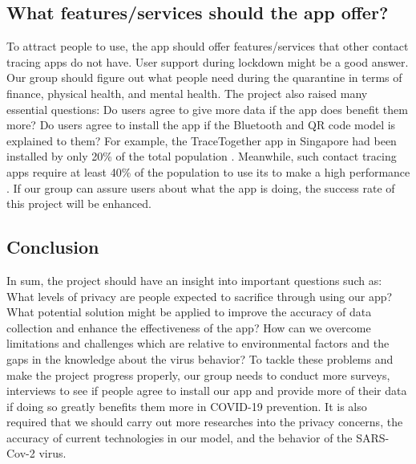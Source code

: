   \subsection{What features/services should the app offer?}
    \par To attract people to use, the app should offer features/services that other contact tracing apps do not have. User support during lockdown might be a good answer. Our group should figure out what people need during the quarantine in terms of finance, physical health, and mental health. The project also raised many essential questions: Do users agree to give more data if the app does benefit them more? Do users agree to install the app if the Bluetooth and QR code model is explained to them? For example, the TraceTogether app in Singapore had been installed by only 20\% of the total population \parencite{SingTraceTogether}. Meanwhile, such contact tracing apps require at least 40\% of the population to use its to make a high performance \parencite{Questions5}. If our group can assure users about what the app is doing, the success rate of this project will be enhanced.
  \subsection{Conclusion}
    \par In sum, the project should have an insight into important questions such as: What levels of privacy are people expected to sacrifice through using our app? What potential solution might be applied to improve the accuracy of data collection and enhance the effectiveness of the app? How can we overcome limitations and challenges which are relative to environmental factors and the gaps in the knowledge about the virus behavior? To tackle these problems and make the project progress properly, our group needs to conduct more surveys, interviews to see if people agree to install our app and provide more
    of their data if doing so greatly benefits them more in COVID-19 prevention. It is also required that we should carry out more researches into the privacy concerns, the accuracy of current technologies in our model, and the behavior of the SARS-Cov-2 virus.


